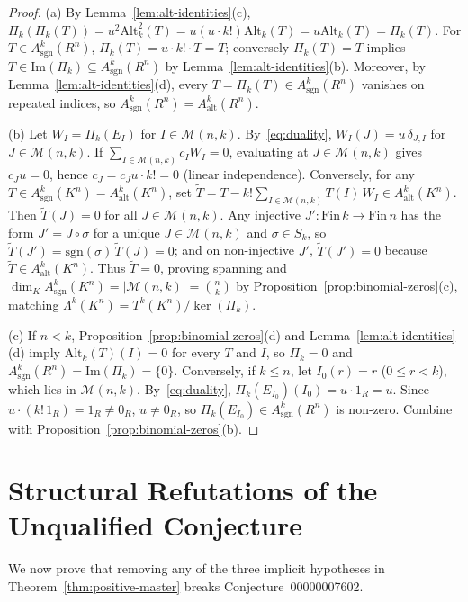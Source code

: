 \documentclass[11pt,a4paper]{article}
\theoremstyle{definition}
\theoremstyle{remark}
\newcommand{\Alt}{\mathrm{Alt}}
\newcommand{\sgn}{\mathrm{sgn}}
\newcommand{\im}{\mathrm{Im}}
\begin{document}
\begin{proof}
(a) By Lemma~\ref{lem:alt-identities}(c), $\Pi_k(\Pi_k(T)) = u^2 \Alt_k^2(T) = u(u \cdot k!)\Alt_k(T) = u \Alt_k(T) = \Pi_k(T)$. For $T \in A^k_{\sgn}(R^n)$, $\Pi_k(T) = u \cdot k! \cdot T = T$; conversely $\Pi_k(T) = T$ implies $T \in \im(\Pi_k) \subseteq A^k_{\sgn}(R^n)$ by Lemma~\ref{lem:alt-identities}(b). Moreover, by Lemma~\ref{lem:alt-identities}(d), every $T = \Pi_k(T) \in A^k_{\sgn}(R^n)$ vanishes on repeated indices, so $A^k_{\sgn}(R^n) = A^k_{\mathrm{alt}}(R^n)$.

(b) Let $W_I = \Pi_k(E_I)$ for $I \in \mathcal{M}(n, k)$. By~\eqref{eq:duality}, $W_I(J) = u\,\delta_{J, I}$ for $J \in \mathcal{M}(n, k)$. If $\sum_{I \in \mathcal{M}(n,k)} c_I W_I = 0$, evaluating at $J \in \mathcal{M}(n, k)$ gives $c_J u = 0$, hence $c_J = c_J u \cdot k! = 0$ (linear independence). Conversely, for any $T \in A^k_{\sgn}(K^n) = A^k_{\mathrm{alt}}(K^n)$, set $\widetilde{T} = T - k! \sum_{I \in \mathcal{M}(n,k)} T(I)\,W_I \in A^k_{\mathrm{alt}}(K^n)$. Then $\widetilde{T}(J) = 0$ for all $J \in \mathcal{M}(n, k)$. Any injective $J' : \mathrm{Fin}\,k \to \mathrm{Fin}\,n$ has the form $J' = J \circ \sigma$ for a unique $J \in \mathcal{M}(n, k)$ and $\sigma \in S_k$, so $\widetilde{T}(J') = \sgn(\sigma)\,\widetilde{T}(J) = 0$; and on non-injective $J'$, $\widetilde{T}(J') = 0$ because $\widetilde{T} \in A^k_{\mathrm{alt}}(K^n)$. Thus $\widetilde{T} = 0$, proving spanning and $\dim_K A^k_{\sgn}(K^n) = |\mathcal{M}(n, k)| = \binom{n}{k}$ by Proposition~\ref{prop:binomial-zeros}(c), matching $\Lambda^k(K^n) = T^k(K^n)/\ker(\Pi_k)$.

(c) If $n < k$, Proposition~\ref{prop:binomial-zeros}(d) and Lemma~\ref{lem:alt-identities}(d) imply $\Alt_k(T)(I) = 0$ for every $T$ and $I$, so $\Pi_k = 0$ and $A^k_{\sgn}(R^n) = \im(\Pi_k) = \{0\}$. Conversely, if $k \le n$, let $I_0(r) = r$ ($0 \le r < k$), which lies in $\mathcal{M}(n, k)$. By~\eqref{eq:duality}, $\Pi_k(E_{I_0})(I_0) = u \cdot 1_R = u$. Since $u \cdot (k!\,1_R) = 1_R \neq 0_R$, $u \neq 0_R$, so $\Pi_k(E_{I_0}) \in A^k_{\sgn}(R^n)$ is non-zero. Combine with Proposition~\ref{prop:binomial-zeros}(b).
\end{proof}

\section{Structural Refutations of the Unqualified Conjecture}

We now prove that removing any of the three implicit hypotheses in Theorem~\ref{thm:positive-master} breaks Conjecture~00000007602.
\end{document}
